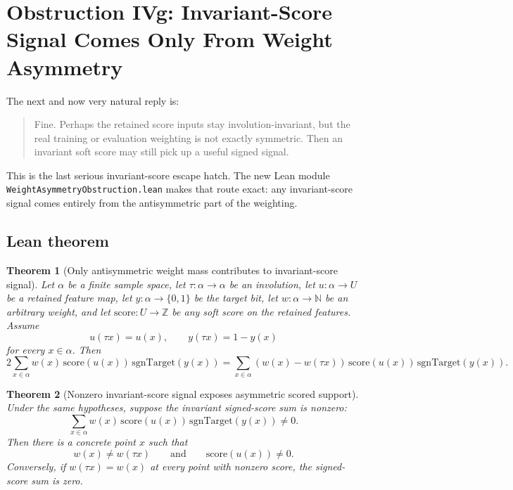 \documentclass[11pt]{article}
\newtheorem{theorem}{Theorem}[section]
\theoremstyle{remark}
\begin{document}
\section{Obstruction IVg: Invariant-Score Signal Comes Only From Weight Asymmetry}

The next and now very natural reply is:
\begin{quote}
Fine.  Perhaps the retained score inputs stay involution-invariant, but the real training or
evaluation weighting is not exactly symmetric.  Then an invariant soft score may still pick up a
useful signed signal.
\end{quote}

This is the last serious invariant-score escape hatch.  The new Lean module
\texttt{WeightAsymmetryObstruction.lean} makes that route exact: any invariant-score signal comes
entirely from the antisymmetric part of the weighting.

\subsection{Lean theorem}

\begin{theorem}[Only antisymmetric weight mass contributes to invariant-score signal]
Let \(\alpha\) be a finite sample space, let \(\tau : \alpha \to \alpha\) be an involution, let
\(u : \alpha \to U\) be a retained feature map, let \(y : \alpha \to \{0,1\}\) be the target bit,
let \(w : \alpha \to \mathbb{N}\) be an arbitrary weight, and let
\(\mathrm{score} : U \to \mathbb{Z}\) be any soft score on the retained features.  Assume
\[
  u(\tau x) = u(x), \qquad y(\tau x) = 1-y(x)
\]
for every \(x \in \alpha\).  Then
\[
  2 \sum_{x \in \alpha} w(x)\,\mathrm{score}(u(x))\,\mathrm{sgnTarget}(y(x))
  =
  \sum_{x \in \alpha} (w(x)-w(\tau x))\,\mathrm{score}(u(x))\,\mathrm{sgnTarget}(y(x)).
\]
\end{theorem}

\begin{theorem}[Nonzero invariant-score signal exposes asymmetric scored support]
Under the same hypotheses, suppose the invariant signed-score sum is nonzero:
\[
  \sum_{x \in \alpha} w(x)\,\mathrm{score}(u(x))\,\mathrm{sgnTarget}(y(x)) \neq 0.
\]
Then there is a concrete point \(x\) such that
\[
  w(x) \neq w(\tau x)
  \qquad\text{and}\qquad
  \mathrm{score}(u(x)) \neq 0.
\]
Conversely, if \(w(\tau x)=w(x)\) at every point with nonzero score, the signed-score sum is zero.
\end{theorem}
\end{document}
